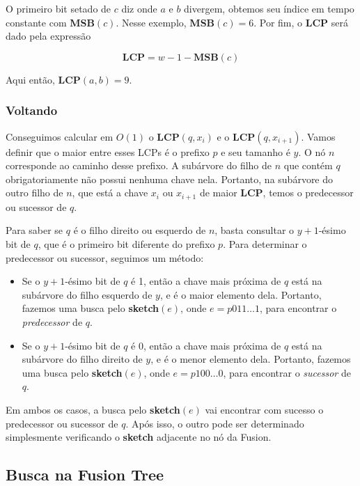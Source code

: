 O primeiro bit setado de $c$ diz onde $a$ e $b$ divergem, obtemos seu índice em
tempo constante com \textbf{MSB}$(c)$. Nesse exemplo, \textbf{MSB}$(c)=6$. Por
fim, o \textbf{LCP} será dado pela expressão

\[
\textbf{LCP} = w - 1 - \textbf{MSB}(c)
\]

Aqui então, \textbf{LCP}$(a,b)=9$.

\subsubsection{Voltando}

Conseguimos calcular em $O(1)$ o \textbf{LCP}$(q, x_i)$ e o \textbf{LCP}$(q,
x_{i+1})$. Vamos definir que o maior entre esses LCPs é o prefixo $p$ e seu
tamanho é $y$. O nó $n$ corresponde ao caminho desse prefixo. A subárvore do
filho de $n$ que contém $q$ obrigatoriamente não possui nenhuma chave nela.
Portanto, na subárvore do outro filho de $n$, que está a chave $x_i$ ou
$x_{i+1}$ de maior \textbf{LCP}, temos o predecessor ou sucessor de $q$.

Para saber se $q$ é o filho direito ou esquerdo de $n$, basta consultar o
$y+1$-ésimo bit de $q$, que é o primeiro bit diferente do prefixo $p$. Para
determinar o predecessor ou sucessor, seguimos um método:

\begin{itemize}
    \item Se o $y+1$-ésimo bit de $q$ é 1, então a chave mais próxima de $q$
    está na subárvore do filho esquerdo de $y$, e é o maior elemento dela.
    Portanto, fazemos uma busca pelo \textbf{sketch}$(e)$, onde $e=p011\dots1$,
    para encontrar o \textit{predecessor} de $q$. 
    \item Se o $y+1$-ésimo bit de $q$ é 0, então a chave mais próxima de $q$
    está na subárvore do filho direito de $y$, e é o menor elemento dela.
    Portanto, fazemos uma busca pelo \textbf{sketch}$(e)$, onde $e=p100\dots0$,
    para encontrar o \textit{sucessor} de $q$. 
\end{itemize}

Em ambos os casos, a busca pelo \textbf{sketch}$(e)$ vai encontrar com sucesso o
predecessor ou sucessor de $q$. Após isso, o outro pode ser determinado
simplesmente verificando o \textbf{sketch} adjacente no nó da Fusion.

\subsection{Busca na Fusion Tree}

